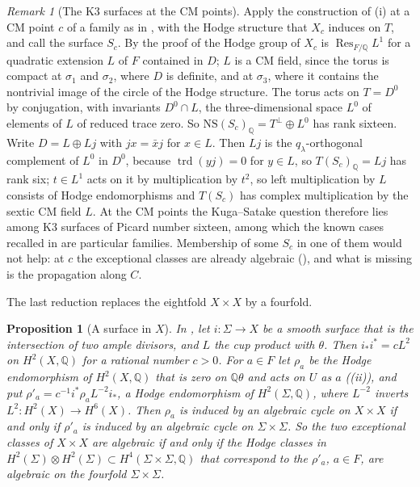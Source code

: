 \documentclass[11pt,reqno]{amsart}
\theoremstyle{plain}
\newtheorem{proposition}[theorem]{Proposition}
\theoremstyle{definition}
\theoremstyle{remark}
\newtheorem{remark}[theorem]{Remark}
\newcommand{\QQ}{\mathbb{Q}}
\newcommand{\NS}{\mathrm{NS}}
\DeclareMathOperator{\Res}{Res}
\begin{document}
\begin{remark}[The K3 surfaces at the CM points]\label{rem:mumfordkscm}
Apply the construction of (i) at a CM point $c$ of a
family as in , with the Hodge structure that
$X_{c}$ induces on $T$, and call the surface $S_{c}$. By the proof of
 the Hodge group of $X_{c}$ is $\Res_{F/\QQ}L^{1}$ for a
quadratic extension $L$ of $F$ contained in $D$; $L$ is a CM field, since the
torus is compact at $\sigma_{1}$ and $\sigma_{2}$, where $D$ is definite, and
at $\sigma_{3}$, where it contains the nontrivial image of the circle of the
Hodge structure. The torus acts on $T=D^{0}$ by conjugation, with invariants
$D^{0}\cap L$, the three-dimensional space $L^{0}$ of elements of $L$ of
reduced trace zero. So $\NS(S_{c})_{\QQ}=T^{\perp}\oplus L^{0}$ has rank
sixteen. Write $D=L\oplus Lj$ with $jx=\bar{x}j$ for $x\in L$. Then $Lj$ is
the $q_{\lambda}$-orthogonal complement of $L^{0}$ in $D^{0}$, because
$\operatorname{trd}(yj)=0$ for $y\in L$, so $T(S_{c})_{\QQ}=Lj$ has rank six;
$t\in L^{1}$ acts on it by multiplication by $t^{2}$, so left multiplication
by $L$ consists of Hodge endomorphisms and $T(S_{c})$ has complex
multiplication by the sextic CM field $L$. At the CM points the Kuga--Satake
question therefore lies among K3 surfaces of Picard number sixteen, among
which the known cases recalled in  are particular
families. Membership of some $S_{c}$ in one of them would not help: at $c$ the exceptional classes are already algebraic
(), and what is missing is the propagation along $C$.
\end{remark}

The last reduction replaces the eightfold $X\times X$ by a fourfold.

\begin{proposition}[A surface in $X$]\label{prop:mumfordsurface}
In , let $i\colon\Sigma\to X$ be a smooth surface that is
the intersection of two ample divisors, and $L$ the cup product with
$\theta$. Then $i_{*}i^{*}=cL^{2}$ on $H^{2}(X,\QQ)$ for a rational number
$c>0$. For $a\in F$ let $\rho_{a}$ be the Hodge endomorphism of
$H^{2}(X,\QQ)$ that is zero on $\QQ\theta$ and acts on $U$ as $a$
((ii)), and put
$\rho'_{a}=c^{-1}i^{*}\rho_{a}L^{-2}i_{*}$, a Hodge endomorphism of
$H^{2}(\Sigma,\QQ)$, where $L^{-2}$ inverts $L^{2}\colon H^{2}(X)\to
H^{6}(X)$. Then $\rho_{a}$ is induced by an algebraic cycle on $X\times X$ if
and only if $\rho'_{a}$ is induced by an algebraic cycle on $\Sigma\times
\Sigma$. So the two exceptional classes of $X\times X$ are algebraic if and
only if the Hodge classes in $H^{2}(\Sigma)\otimes H^{2}(\Sigma)\subset
H^{4}(\Sigma\times\Sigma,\QQ)$ that correspond to the $\rho'_{a}$, $a\in F$,
are algebraic on the fourfold $\Sigma\times\Sigma$.
\end{proposition}
\end{document}
